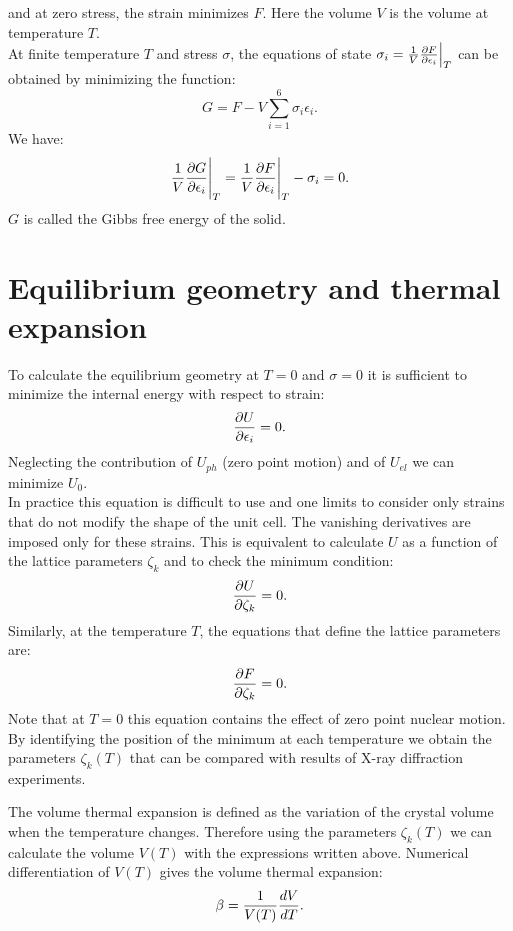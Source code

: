 \documentclass[12pt,a4paper]{article}
\begin{document}
and at zero stress, the strain minimizes $F$.
Here the volume $V$ is the volume at temperature $T$. \\
At finite temperature $T$ and stress $\sigma$, the equations of state
 $\sigma_i={1\over V}
{\partial F\over \partial \epsilon_i}\Big|_T$ can be obtained by 
minimizing the function:
\begin{equation}
G= F - V \sum_{i=1}^6 \sigma_i \epsilon_i.
\end{equation}
We have:
\begin{equation}
{1\over V} {\partial G \over \partial \epsilon_i}\Bigg |_T = {1\over V} 
{\partial F \over \partial \epsilon_i}\Bigg |_T - \sigma_i = 0.
\end{equation}
$G$ is called the Gibbs free energy of the solid.

\newpage
\section{\color{coral}Equilibrium geometry and thermal expansion}
To calculate the equilibrium geometry at $T=0$ and $\sigma=0$ it
is sufficient to minimize the internal energy with respect to strain:
\begin{equation}
{\partial U \over \partial \epsilon_i}=0.
\end{equation}
Neglecting the contribution of $U_{ph}$ (zero point motion) and
of $U_{el}$ we can minimize 
$U_0$.\\
In practice this equation is difficult to use and one limits to consider
only strains that do not modify the shape of the unit cell. The
vanishing derivatives are imposed only for these strains.
This is equivalent to calculate $U$ as a function of the lattice parameters 
$\zeta_k$ and to check the minimum condition:
\begin{equation}
{\partial U \over \partial \zeta_k}=0.
\end{equation}
Similarly, at the temperature $T$, the equations that define the lattice 
parameters are:
\begin{equation}
{\partial F \over \partial \zeta_k}=0.
\end{equation}
Note that at $T=0$ this equation contains the effect of zero point nuclear
motion. By identifying the position of the minimum at each temperature 
we obtain the parameters $\zeta_k (T)$ that can be compared with
results of X-ray diffraction experiments.

The volume thermal expansion is defined as the variation of the crystal
volume when the temperature changes. Therefore using the parameters
$\zeta_k (T)$ we can calculate the volume $V(T)$
with the expressions written above.  
Numerical differentiation of $V(T)$ gives the volume thermal expansion:
\begin{equation}
\beta = {1 \over V(T)} {d V \over d T}.
\end{equation}
\end{document}
